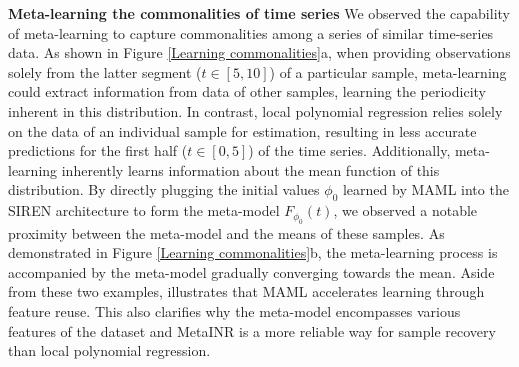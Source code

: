 \documentclass{article}
\begin{document}

\textbf{Meta-learning the commonalities of time series}
We observed the capability of meta-learning to capture commonalities among a series of similar time-series data.
As shown in Figure \ref{Learning commonalities}a, when providing observations solely from the latter segment ($t \in [5, 10]$) of a particular sample, 
meta-learning could extract information from data of other samples, learning the periodicity inherent in this distribution. 
In contrast, local polynomial regression relies solely on the data of an individual sample for estimation, 
resulting in less accurate predictions for the first half ($t \in [0, 5]$) of the time series.
Additionally, meta-learning inherently learns information about the mean function of this distribution. 
By directly plugging the initial values $\phi_0$ learned by MAML into the SIREN architecture to form the meta-model $F_{\phi_0}(t)$,
we observed a notable proximity between the meta-model and the means of these samples. 
As demonstrated in Figure \ref{Learning commonalities}b, the meta-learning process is accompanied by the meta-model gradually converging towards the mean.
{Aside from these two examples, \cite{raghu2019rapid}  illustrates that MAML accelerates learning through feature reuse.}
This also clarifies why the meta-model encompasses various features of the dataset and MetaINR is a more reliable way for sample recovery than local polynomial regression. 
\end{document}
